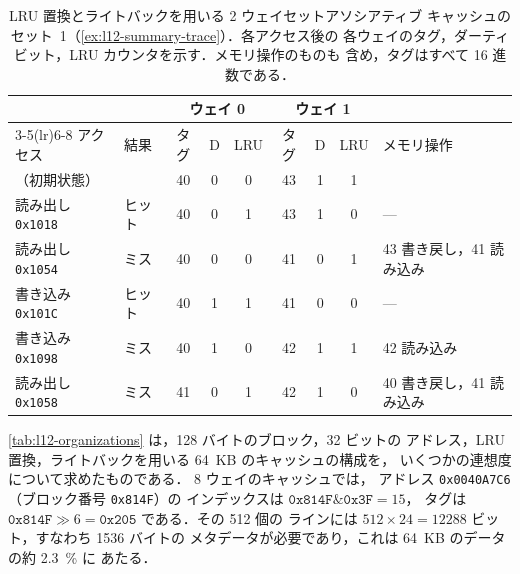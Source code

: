 \documentclass[../main.tex]{subfiles}
\begin{document}
\begin{table}[htbp]
  \centering\small
  \caption{LRU 置換とライトバックを用いる 2 ウェイセットアソシアティブ
    キャッシュのセット~1（\cref{ex:l12-summary-trace}）．各アクセス後の
    各ウェイのタグ，ダーティビット，LRU カウンタを示す．メモリ操作のものも
    含め，タグはすべて 16 進数である．}
  \label{tab:l12-summary-trace}
  \setlength{\tabcolsep}{4pt}
  \begin{tabular}{@{}llccccccl@{}}
    \toprule
    & & \multicolumn{3}{c}{ウェイ 0} & \multicolumn{3}{c}{ウェイ 1} & \\
    \cmidrule(lr){3-5}\cmidrule(lr){6-8}
    アクセス & 結果 & タグ & D & LRU & タグ & D & LRU & メモリ操作 \\
    \midrule
    （初期状態）                &        & 40 & 0 & 0 & 43 & 1 & 1 & \\
    読み出し \texttt{0x1018}  & ヒット & 40 & 0 & 1 & 43 & 1 & 0 & --- \\
    読み出し \texttt{0x1054}  & ミス   & 40 & 0 & 0 & 41 & 0 & 1 & 43 書き戻し，41 読み込み \\
    書き込み \texttt{0x101C}  & ヒット & 40 & 1 & 1 & 41 & 0 & 0 & --- \\
    書き込み \texttt{0x1098}  & ミス   & 40 & 1 & 0 & 42 & 1 & 1 & 42 読み込み \\
    読み出し \texttt{0x1058}  & ミス   & 41 & 0 & 1 & 42 & 1 & 0 & 40 書き戻し，41 読み込み \\
    \bottomrule
  \end{tabular}
\end{table}

\begin{example}
  \label{ex:l12-overhead}
  \cref{tab:l12-organizations} は，128 バイトのブロック，32 ビットの
  アドレス，LRU 置換，ライトバックを用いる 64~KB のキャッシュの構成を，
  いくつかの連想度について求めたものである．%
  8 ウェイのキャッシュでは，
  アドレス \texttt{0x0040A7C6}（ブロック番号 \texttt{0x814F}）の
  インデックスは $\texttt{0x814F} \mathbin{\&} \texttt{0x3F} = 15$，
  タグは $\texttt{0x814F} \gg 6 = \texttt{0x205}$ である．その 512 個の
  ラインには $512 \times 24 = \num{12288}$ ビット，すなわち 1536 バイトの
  メタデータが必要であり，これは 64~KB のデータの約 \SI{2.3}{\percent} に
  あたる．
\end{example}
\end{document}

